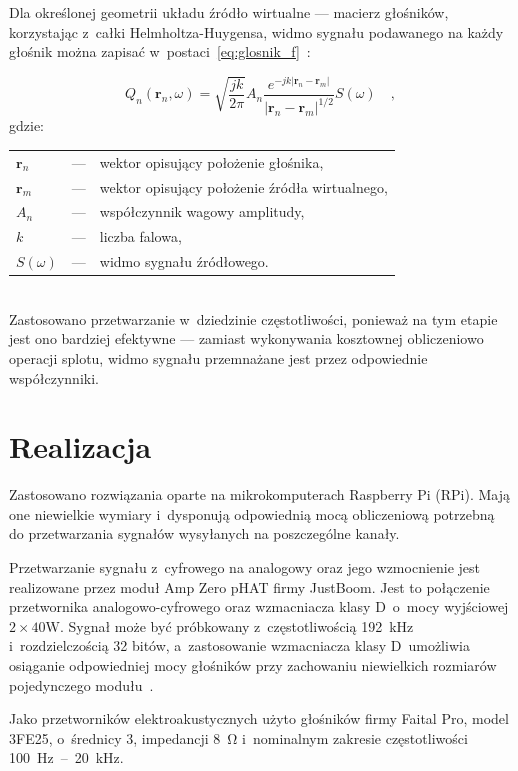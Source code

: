 \documentclass[10pt, a4paper]{article}
\let\Oldsection\section
\renewcommand{\section}{\FloatBarrier\Oldsection}
\begin{document}
Dla określonej geometrii układu źródło wirtualne --- macierz głośników,
korzystając z~całki Helmholtza-Huygensa, widmo sygnału podawanego na każdy głośnik można zapisać
w~postaci~\eqref{eq:glosnik_f}~\cite{enhancement}:

\begin{equation}
  Q_n(\bm{r}_n,\omega) = \sqrt{\frac{jk}{2\pi}} A_n \frac {e^{-jk|\bm{r}_n-\bm{r}_m|}}{|\bm{r}_n-\bm{r}_m|^{1/2}} S(\omega) \quad,
  \label{eq:glosnik_f}
\end{equation}
gdzie:\\
\indent \begin{tabular}{l c p{}}
  $\bm{r}_n$ & --- & wektor opisujący położenie głośnika, \\
  $\bm{r}_m$ & --- & wektor opisujący położenie źródła wirtualnego,\\
  $A_n$ & --- & współczynnik wagowy amplitudy,\\
  $k$ & --- & liczba falowa,\\
  $S(\omega)$ & --- & widmo sygnału źródłowego.
\end{tabular}\\

Zastosowano przetwarzanie w~dziedzinie częstotliwości, ponieważ na tym etapie jest ono bardziej efektywne
--- zamiast wykonywania kosztownej obliczeniowo operacji splotu, widmo sygnału przemnażane jest przez
odpowiednie współczynniki.

\section{Realizacja}

Zastosowano rozwiązania oparte na mikrokomputerach Raspberry
Pi (RPi). Mają one niewielkie wymiary i~dysponują odpowiednią mocą obliczeniową
potrzebną do przetwarzania sygnałów wysyłanych na poszczególne kanały.

Przetwarzanie sygnału z~cyfrowego na analogowy oraz jego wzmocnienie jest
realizowane przez moduł Amp Zero pHAT firmy JustBoom. Jest to połączenie
przetwornika analogowo-cyfrowego oraz wzmacniacza klasy D~o~mocy wyjściowej
$2\times40\si{\watt}$. Sygnał może być próbkowany z~częstotliwością
\SI{192}{\kilo\hertz} i~rozdzielczością \num{32} bitów, a~zastosowanie
wzmacniacza klasy D~umożliwia osiąganie odpowiedniej mocy głośników przy
zachowaniu niewielkich rozmiarów pojedynczego modułu~\cite{oska}.

Jako przetworników elektroakustycznych użyto głośników firmy Faital Pro, model 3FE25,
o~średnicy \SI{3}{\inch}, impedancji \SI{8}{\ohm} i~nominalnym zakresie 
częstotliwości \SI{100}{\hertz}~--~\SI{20}{\kilo\hertz}.
\end{document}
